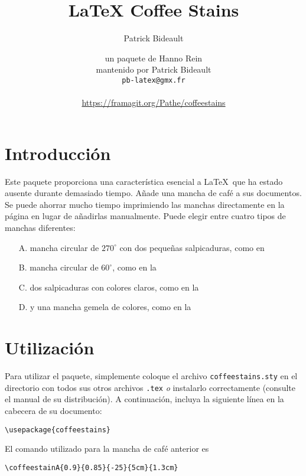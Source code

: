\documentclass[a4paper, 11pt, BCOR = 0 pt, oneside]{scrartcl}
\author{Patrick Bideault}
\begin{document}
\title{LaTeX Coffee Stains}
\author{un paquete de Hanno Rein\\
  mantenido por Patrick Bideault\\
  \texttt{pb-latex@gmx.fr}\\
  ~\\
  \url{https://framagit.org/Pathe/coffeestains}}
\renewcommand{\today}{version \gitRel{} -- \DTMtoday{}}
\maketitle

\label{stainA}
\section{Introducción}
Este paquete proporciona una característica esencial a \LaTeX~que ha estado
ausente durante demasiado tiempo. Añade una mancha de café a sus documentos. Se
puede ahorrar mucho tiempo imprimiendo las manchas directamente en la página en
lugar de añadirlas manualmente. Puede elegir entre cuatro tipos de manchas
diferentes:
\begin{itemize}
\item[A.] mancha circular de $270^\circ$ con dos pequeñas salpicaduras, como en 
  \item[B.] mancha circular de $60^\circ$, como en la 
  \item[C.] dos salpicaduras con colores claros, como en la 
  \item[D.] y una mancha gemela de colores, como en la 
\end{itemize}

\section{Utilización}
Para utilizar el paquete, simplemente coloque el archivo
\texttt{coffeestains.sty} en el directorio con todos sus otros archivos
\texttt{.tex} \textit{o} instalarlo correctamente (consulte el manual de su
distribución). A continuación, incluya la siguiente línea en la cabecera de su
documento:
\begin{verbatim}
\usepackage{coffeestains}
\end{verbatim}

\vfill{}

\begin{tcolorbox}
  El comando utilizado para la mancha de café anterior es

  \verb|\coffeestainA{0.9}{0.85}{-25}{5cm}{1.3cm}|
\end{tcolorbox}
\newpage{}
\label{stainB}
\end{document}
